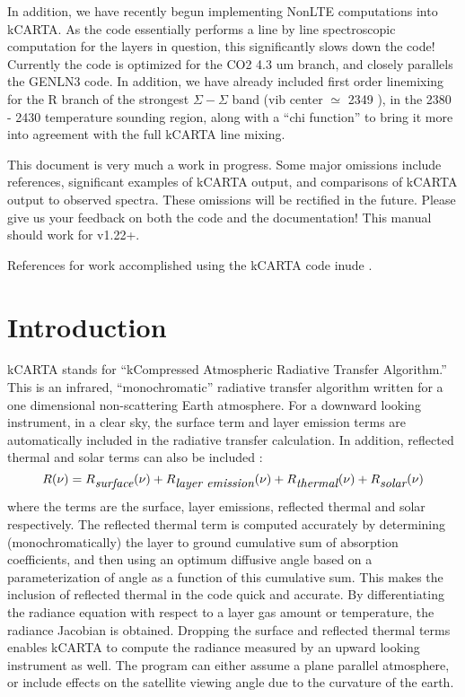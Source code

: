 \documentclass[12pt]{article}
\newcommand{\kc}{\textsf{kCARTA}\xspace}
\begin{document}
In addition, we have recently begun implementing NonLTE computations into \kc.
As the code essentially performs a line by line spectroscopic computation for
the layers in question, this significantly slows down the code! Currently the
code is optimized for the CO2 4.3 um branch, and closely parallels the GENLN3
code. In addition, we have already included first order linemixing for the R 
branch of the strongest $\Sigma-\Sigma$ band (vib center $\simeq$ 2349 \wn), 
in the 2380 - 2430 \wn temperature sounding region, along with a 
``chi function'' to bring it more into agreement with the full  kCARTA line
mixing.

This document is very much a work in progress.  Some major omissions
include references, significant examples of \kc output, and
comparisons of \kc output to observed spectra.  These omissions will
be rectified in the future.  Please give us your feedback on both the
code and the documentation!  This manual should work for v1.22+.

References for work accomplished using the kCARTA code inude \cite{mac:19,mac:17*2,str:02*2}.

\newpage
\section{Introduction}

\kc stands for ``kCompressed Atmospheric Radiative Transfer
Algorithm.''  This is an infrared, ``monochromatic'' radiative
transfer algorithm written for a one dimensional non-scattering Earth
atmosphere.  For a downward looking instrument, in a clear sky, 
the surface term and layer emission terms are automatically included in the 
radiative transfer calculation.  In addition, reflected thermal and solar 
terms can also be included :
\begin{equation}
R(\nu) = R_{\hbox{\it surface}}(\nu) + R_{\hbox{\it layer emission}}(\nu) + 
R_{\hbox{\it thermal}}(\nu) + R_{\hbox{\it solar}}(\nu)
\end{equation}
where the terms are the surface, layer emissions, reflected thermal
and solar respectively.  The reflected thermal term is computed
accurately by determining (monochromatically) the layer to ground
cumulative sum of absorption coefficients, and then using an optimum
diffusive angle based on a parameterization of angle as a function of
this cumulative sum.  This makes the inclusion of reflected thermal in
the code quick and accurate.   By differentiating the radiance equation
with respect to a layer gas amount or temperature, the radiance
Jacobian is obtained.  Dropping the surface and reflected thermal terms
enables \kc to compute the radiance measured by an upward looking
instrument as well.  The program can either assume a plane parallel
atmosphere, or include effects on the satellite viewing angle due to
the curvature of the earth.
\end{document}
